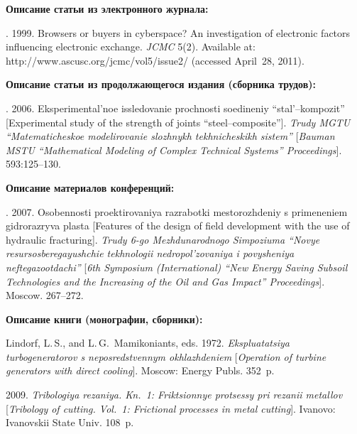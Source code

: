 {\begin{enumerate}[1.]
{\noindent
\textbf{Описание статьи из электронного журнала:}

. 1999. Browsers or buyers in cyberspace? An 
investigation of electronic factors influencing electronic exchange. \textit{JCMC} 
5(2). Available at: {\sf http://www.ascusc.org/jcmc/vol5/issue2/} (accessed April~28, 2011).




\noindent
\textbf{Описание статьи из продолжающегося издания (сборника трудов):}

. 2006. Eksperimental'noe 
issledovanie prochnosti soedineniy ``stal'--kompozit'' [Experimental study of 
the strength of joints ``steel--composite'']. \textit{Trudy MGTU 
``Matematicheskoe modelirovanie slozhnykh tekh\-ni\-che\-skikh sistem''} 
[\textit{Bauman MSTU ``Mathematical Modeling of Complex Technical 
Systems'' Proceedings}]. 593:125--130.

\pagebreak

\noindent
\textbf{Описание материалов конференций:}

. 2007. Osobennosti proektirovaniya razrabotki mestorozhdeniy 
s primeneniem gidrorazryva 
plasta [Features of the design of field development with the use of hydraulic fracturing]. 
\textit{Trudy 6-go 
Mezhdu\-na\-rod\-no\-go Simpoziuma ``Novye resursosberegayushchie tekhnologii nedropol'zovaniya i povysheniya 
neftegazootdachi''} [\textit{6th  Symposium (International) ``New Energy Saving Subsoil Technologies and 
the Increasing of the Oil and Gas Impact'' Proceedings}]. Moscow. 267--272.

\thispagestyle{empty}



\noindent
\textbf{Описание книги (монографии, сборники):}



Lindorf, L.\,S., and L.\,G.~Mamikoniants, eds. 1972. 
\textit{Ekspluatatsiya turbogeneratorov s neposredstvennym 
okhlazhdeniem} [\textit{Operation of turbine generators with direct cooling}]. 
Moscow: Energy Publs. 352~p.


 2009. \textit{Tribologiya rezaniya. Kn.~1: Friktsionnye protsessy 
pri rezanii metallov} 
[\textit{Tribology of cutting. Vol.~1: Frictional processes in metal cutting}]. Ivanovo: Ivanovskii 
State Univ. 108~p.

}
\end{enumerate}}
